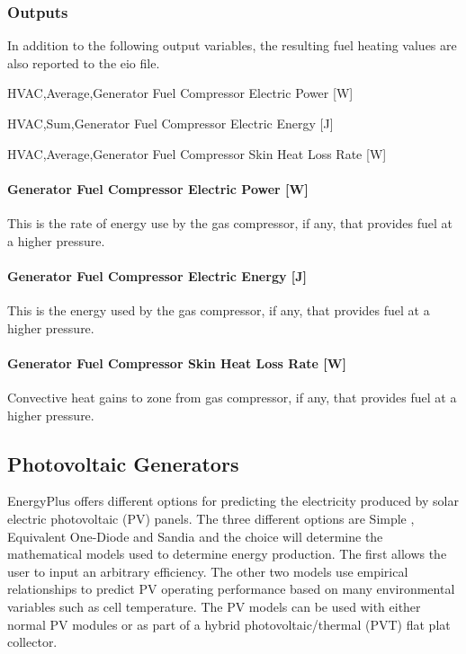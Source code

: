\subsubsection{Outputs}\label{outputs-10-001}

In addition to the following output variables, the resulting fuel heating values are also reported to the eio file.

HVAC,Average,Generator Fuel Compressor Electric Power {[}W{]}

HVAC,Sum,Generator Fuel Compressor Electric Energy {[}J{]}

HVAC,Average,Generator Fuel Compressor Skin Heat Loss Rate {[}W{]}

\paragraph{Generator Fuel Compressor Electric Power {[}W{]}}\label{generator-fuel-compressor-electric-power-w-1}

This is the rate of energy use by the gas compressor, if any, that provides fuel at a higher pressure.

\paragraph{Generator Fuel Compressor Electric Energy {[}J{]}}\label{generator-fuel-compressor-electric-energy-j-1}

This is the energy used by the gas compressor, if any, that provides fuel at a higher pressure.

\paragraph{Generator Fuel Compressor Skin Heat Loss Rate {[}W{]}}\label{generator-fuel-compressor-skin-heat-loss-rate-w-1}

Convective heat gains to zone from gas compressor, if any, that provides fuel at a higher pressure.

\subsection{Photovoltaic Generators}\label{photovoltaic-generators}

EnergyPlus offers different options for predicting the electricity produced by solar electric photovoltaic (PV) panels. The three different options are Simple , Equivalent One-Diode and Sandia and the choice will determine the mathematical models used to determine energy production. The first allows the user to input an arbitrary efficiency. The other two models use empirical relationships to predict PV operating performance based on many environmental variables such as cell temperature. The PV models can be used with either normal PV modules or as part of a hybrid photovoltaic/thermal (PVT) flat plat collector.

